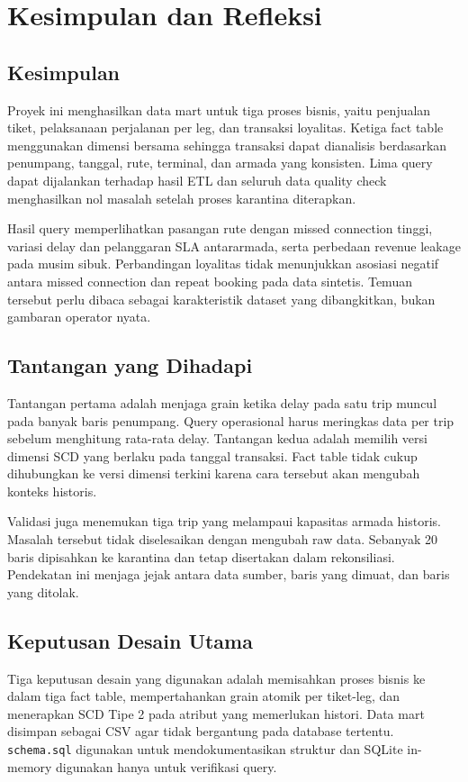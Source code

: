 \section{Kesimpulan dan Refleksi}
\subsection{Kesimpulan}

Proyek ini menghasilkan data mart untuk tiga proses bisnis, yaitu penjualan
tiket, pelaksanaan perjalanan per leg, dan transaksi loyalitas. Ketiga fact table
menggunakan dimensi bersama sehingga transaksi dapat dianalisis berdasarkan
penumpang, tanggal, rute, terminal, dan armada yang konsisten. Lima query dapat
dijalankan terhadap hasil ETL dan seluruh data quality check menghasilkan nol
masalah setelah proses karantina diterapkan.

Hasil query memperlihatkan pasangan rute dengan missed connection tinggi, variasi
delay dan pelanggaran SLA antararmada, serta perbedaan revenue leakage pada musim
sibuk. Perbandingan loyalitas tidak menunjukkan asosiasi negatif antara missed
connection dan repeat booking pada data sintetis. Temuan tersebut perlu dibaca
sebagai karakteristik dataset yang dibangkitkan, bukan gambaran operator nyata.

\subsection{Tantangan yang Dihadapi}

Tantangan pertama adalah menjaga grain ketika delay pada satu trip muncul pada
banyak baris penumpang. Query operasional harus meringkas data per trip sebelum
menghitung rata-rata delay. Tantangan kedua adalah memilih versi dimensi SCD yang
berlaku pada tanggal transaksi. Fact table tidak cukup dihubungkan ke versi
dimensi terkini karena cara tersebut akan mengubah konteks historis.

Validasi juga menemukan tiga trip yang melampaui kapasitas armada historis.
Masalah tersebut tidak diselesaikan dengan mengubah raw data. Sebanyak 20 baris
dipisahkan ke karantina dan tetap disertakan dalam rekonsiliasi. Pendekatan ini
menjaga jejak antara data sumber, baris yang dimuat, dan baris yang ditolak.

\subsection{Keputusan Desain Utama}

Tiga keputusan desain yang digunakan adalah memisahkan proses bisnis ke dalam
tiga fact table, mempertahankan grain atomik per tiket-leg, dan menerapkan SCD
Tipe 2 pada atribut yang memerlukan histori. Data mart disimpan sebagai CSV agar
tidak bergantung pada database tertentu. \texttt{schema.sql} digunakan untuk
mendokumentasikan struktur dan SQLite in-memory digunakan hanya untuk verifikasi
query.

